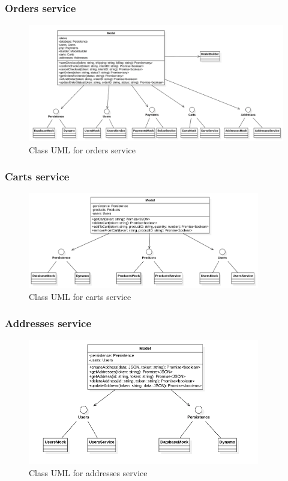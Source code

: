 \subsubsection{Orders service}
\begin{figure}[H]
    \includegraphics[width=\textwidth]{res/images/class-diagrams/orders.png}
    \caption{Class UML for orders service}
\end{figure}

\subsubsection{Carts service}
\begin{figure}[H]
    \includegraphics[width=0.9\textwidth]{res/images/class-diagrams/carts.png}
    \caption{Class UML for carts service}
\end{figure}

\subsubsection{Addresses service}
\begin{figure}[H]
    \includegraphics[width=0.9\textwidth]{res/images/class-diagrams/addresses.png}
    \caption{Class UML for addresses service}
\end{figure}

